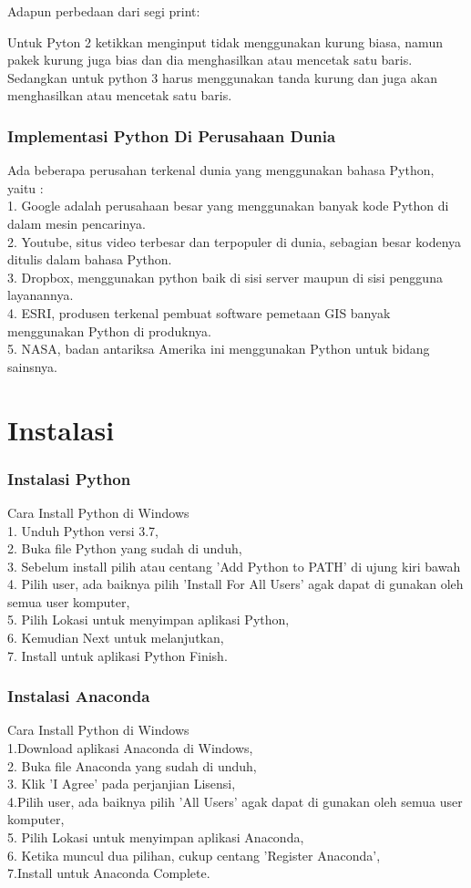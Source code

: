 Adapun perbedaan dari segi print:

Untuk Pyton 2 ketikkan menginput tidak menggunakan kurung biasa, namun pakek kurung juga bias dan dia menghasilkan atau mencetak satu baris. Sedangkan untuk python 3 harus menggunakan tanda kurung dan juga akan menghasilkan atau mencetak satu baris.\\

\subsubsection{Implementasi Python Di Perusahaan Dunia}

Ada beberapa perusahan terkenal dunia yang menggunakan bahasa Python, yaitu :\\
1. Google adalah perusahaan besar yang menggunakan banyak kode Python di dalam mesin pencarinya.\\
2. Youtube, situs video terbesar dan terpopuler di dunia, sebagian besar kodenya ditulis dalam bahasa Python.\\
3. Dropbox, menggunakan python baik di sisi server maupun di sisi pengguna layanannya.\\
4. ESRI, produsen terkenal pembuat software pemetaan GIS banyak menggunakan Python di produknya.\\
5. NASA, badan antariksa Amerika ini menggunakan Python untuk bidang sainsnya.
\section{Instalasi}
\subsubsection{Instalasi Python}

Cara Install Python di Windows\\
1. Unduh Python versi 3.7,\\
2. Buka file Python yang sudah di unduh,\\
3. Sebelum install pilih atau centang 'Add Python to PATH' di ujung kiri bawah
4. Pilih user, ada baiknya pilih 'Install For All Users' agak dapat di gunakan oleh semua user komputer,\\
5. Pilih Lokasi untuk menyimpan aplikasi Python,\\
6. Kemudian Next untuk melanjutkan,\\
7. Install untuk aplikasi Python Finish.
\subsubsection{Instalasi Anaconda}
Cara Install Python di Windows\\
1.Download aplikasi Anaconda di Windows, \\
2. Buka file Anaconda yang sudah di unduh,\\
3. Klik 'I Agree' pada perjanjian Lisensi,\\
4.Pilih user, ada baiknya pilih 'All Users' agak dapat di gunakan oleh semua user komputer,\\
5. Pilih Lokasi untuk menyimpan aplikasi Anaconda,\\
6. Ketika muncul dua pilihan, cukup centang 'Register Anaconda',\\
7.Install untuk Anaconda Complete.
